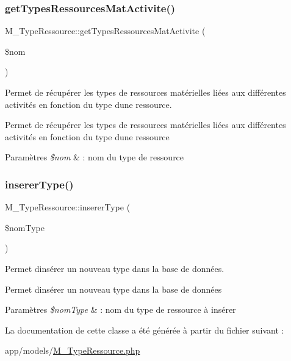 \subsubsection{\texorpdfstring{get\+Types\+Ressources\+Mat\+Activite()}{getTypesRessourcesMatActivite()}}
{\footnotesize\ttfamily M\+\_\+\+Type\+Ressource\+::get\+Types\+Ressources\+Mat\+Activite (\begin{DoxyParamCaption}\item[{}]{\$nom }\end{DoxyParamCaption})}



Permet de récupérer les types de ressources matérielles liées aux différentes activités en fonction du type d\textquotesingle{}une ressource. 

Permet de récupérer les types de ressources matérielles liées aux différentes activités en fonction du type d\textquotesingle{}une ressource 
\begin{DoxyParams}{Paramètres}
{\em \$nom} & \+: nom du type de ressource \\
\hline
\end{DoxyParams}
\mbox{\label{class_m___type_ressource_ac4e32311ae87ecbde6e25e54479525aa}} 
\subsubsection{\texorpdfstring{inserer\+Type()}{insererType()}}
{\footnotesize\ttfamily M\+\_\+\+Type\+Ressource\+::inserer\+Type (\begin{DoxyParamCaption}\item[{}]{\$nom\+Type }\end{DoxyParamCaption})}



Permet d\textquotesingle{}insérer un nouveau type dans la base de données. 

Permet d\textquotesingle{}insérer un nouveau type dans la base de données 
\begin{DoxyParams}{Paramètres}
{\em \$nom\+Type} & \+: nom du type de ressource à insérer \\
\hline
\end{DoxyParams}


La documentation de cette classe a été générée à partir du fichier suivant \+:\begin{DoxyCompactItemize}
\item 
app/models/\hyperlink{_m___type_ressource_8php}{M\+\_\+\+Type\+Ressource.\+php}\end{DoxyCompactItemize}
